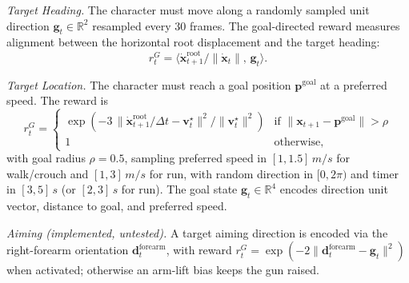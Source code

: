 \textit{Target Heading.} The character must move along a randomly sampled unit direction $\mathbf{g}_t \in \mathbb{R}^2$ resampled every 30 frames. The goal-directed reward measures alignment between the horizontal root displacement and the target heading:
\[
    r_t^G = \langle \dot{\mathbf{x}}^{\text{root}}_{t+1} / \|\dot{\mathbf{x}}_t\|, \, \mathbf{g}_t \rangle.
\]

\textit{Target Location.} The character must reach a goal position $\mathbf{p}^{\text{goal}}$ at a preferred speed. The reward is
\[
    r_t^G = \begin{cases} \exp\!\left(-3 \,\| \dot{\mathbf{x}}^{\text{root}}_{t+1}/\Delta t - \mathbf{v}^{\star}_t \|^2 / \|\mathbf{v}^{\star}_t\|^2 \right) & \text{if } \|\mathbf{x}_{t+1} - \mathbf{p}^{\text{goal}}\| > \rho \\ 1 & \text{otherwise}, \end{cases}
\]
with goal radius $\rho = 0.5$, sampling preferred speed in $[1, 1.5]\,m/s$ for walk/crouch and $[1, 3]\,m/s$ for run, with random direction in $[0, 2\pi)$ and timer in $[3,5]\,s$ (or $[2,3]\,s$ for run). The goal state $\mathbf{g}_t \in \mathbb{R}^4$ encodes direction unit vector, distance to goal, and preferred speed.

\textit{Aiming (implemented, untested).} A target aiming direction is encoded via the right-forearm orientation $\mathbf{d}^{\text{forearm}}_t$, with reward $r_t^G = \exp(-2\|\mathbf{d}^{\text{forearm}}_t - \mathbf{g}_t\|^2)$ when activated; otherwise an arm-lift bias keeps the gun raised.

\begin{table}[htbp]
\centering
\caption{Task-based locomotion performance at convergence.}
\label{tab:loco_metrics}
\end{table}

